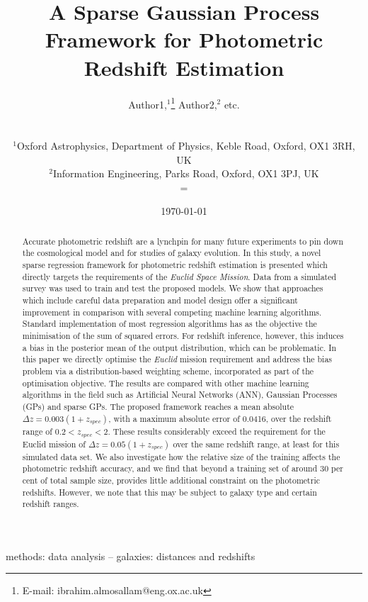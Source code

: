 \documentclass[useAMS,usenatbib,fleqn]{mn2e}
\title[A Sparse Gaussian Process Framework for Photometric Redshift Estimation]{A Sparse Gaussian Process Framework for Photometric Redshift Estimation}
\author[Almosallam et al.]
{\parbox{\textwidth}{Author1,$^1$\thanks{E-mail: ibrahim.almosallam@eng.ox.ac.uk}
Author2,$^{2}$ etc.
}
\vspace{0.4cm}\\
\parbox{\textwidth}{
$^1$Oxford Astrophysics, Department of Physics, Keble Road, Oxford, OX1 3RH, UK\\
$^2$Information Engineering, Parks Road, Oxford, OX1 3PJ, UK\\=
}}
\begin{document}
\date{\today}

\pagerange{\pageref{firstpage}--\pageref{lastpage}} 

\maketitle

\label{firstpage}

\begin{abstract}
Accurate photometric redshift are a lynchpin for many future experiments to pin down the cosmological model and for studies of galaxy evolution. In this study, a novel sparse regression framework for photometric redshift estimation is presented which directly targets the requirements of the {\em Euclid Space Mission}. Data from a simulated survey was used to train and test the proposed models. We show that approaches which include careful data preparation and model design offer a significant improvement in comparison with several competing machine learning algorithms. Standard implementation of most regression algorithms has as the objective the minimisation of the sum of squared errors. For redshift inference, however, this induces a bias in the posterior mean of the output distribution, which can be problematic. In this paper we directly optimise the {\em Euclid} mission requirement and address the bias problem via a distribution-based weighting scheme, incorporated as part of the optimisation objective. The results are compared with other machine learning algorithms in the field such as Artificial Neural Networks (ANN), Gaussian Processes (GPs) and sparse GPs. The proposed framework reaches a mean absolute $\Delta z = 0.003(1+z_{spec})$, with a maximum absolute error of 0.0416, over the redshift range of $0.2 < z_{spec} < 2$. These results considerably exceed the requirement for the Euclid mission of $\Delta z = 0.05(1+z_{spec})$ over the same redshift range, at least for this simulated data set.	We also investigate how the relative  size of the training affects the photometric redshift accuracy, and we find that beyond a training set of around 30 per cent of total sample size, provides little additional constraint on the photometric redshifts. However, we note that this may be subject to galaxy type and certain redshift ranges.
\end{abstract}

\begin{keywords}
methods: data analysis -- galaxies: distances and redshifts
\end{keywords}
\end{document}
